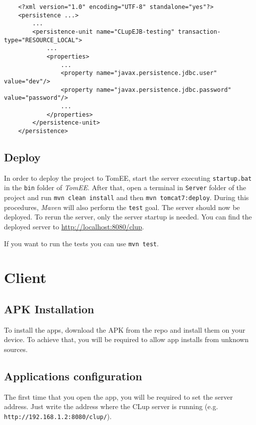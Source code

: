 \begin{lstlisting}
	<?xml version="1.0" encoding="UTF-8" standalone="yes"?>
	<persistence ...>
		...
		<persistence-unit name="CLupEJB-testing" transaction-type="RESOURCE_LOCAL">
			...
			<properties>
				...
				<property name="javax.persistence.jdbc.user" value="dev"/>
				<property name="javax.persistence.jdbc.password" value="password"/>
				...
			</properties>
		</persistence-unit>
	</persistence>
\end{lstlisting}


\subsection{Deploy}
In order to deploy the project to TomEE, start the server executing \verb|startup.bat| in the \verb|bin| folder of \textit{TomEE}.\newline
After that, open a terminal in \verb|Server| folder of the project and run \verb|mvn clean install| and then \verb|mvn tomcat7:deploy|.\newline
During this procedures, \textit{Maven} will also perform the \verb|test| goal.\newline
The server should now be deployed. To rerun the server, only the server startup is needed.\newline
You can find the deployed server to \href{http://localhost:8080/clup}{http://localhost:8080/clup}.

If you want to run the tests you can use \verb|mvn test|.

\clearpage

\section{Client}
\subsection{APK Installation}
To install the apps, download the APK from the repo and install them on your device.\newline
To achieve that, you will be required to allow app installs from unknown sources.\newline
\subsection{Applications configuration}
The first time that you open the app, you will be required to set the server address.\newline
Just write the address where the CLup server is running (e.g. \verb|http://192.168.1.2:8080/clup/|).
